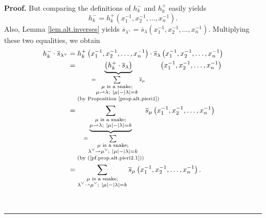 \documentclass[numbers=enddot,12pt,final,onecolumn,notitlepage]{scrartcl}%
\theoremstyle{definition}
\newenvironment{proof}[1][Proof]{\noindent\textbf{#1.} }{\ \rule{0.5em}{0.5em}}
\let\sumnonlimits\sum
\renewcommand{\sum}{\sumnonlimits\limits}
\newenvironment{vershort}{}{}
\begin{document}
\begin{proof}
\begin{vershort}
But comparing the definitions of $h_{k}^{-}$ and $h_{k}^{+}$ easily yields%
\[
h_{k}^{-}=h_{k}^{+}\left(  x_{1}^{-1},x_{2}^{-1},\ldots,x_{n}^{-1}\right)  .
\]
Also, Lemma \ref{lem.alt.inverses} yields $\overline{s}_{\lambda^{\vee}%
}=\overline{s}_{\lambda}\left(  x_{1}^{-1},x_{2}^{-1},\ldots,x_{n}%
^{-1}\right)  $. Multiplying these two equalities, we obtain%
\begin{align*}
h_{k}^{-}\cdot\overline{s}_{\lambda^{\vee}}  &  =h_{k}^{+}\left(  x_{1}%
^{-1},x_{2}^{-1},\ldots,x_{n}^{-1}\right)  \cdot\overline{s}_{\lambda}\left(
x_{1}^{-1},x_{2}^{-1},\ldots,x_{n}^{-1}\right) \\
&  =\underbrace{\left(  h_{k}^{+}\cdot\overline{s}_{\lambda}\right)
}_{\substack{=\sum_{\substack{\mu\text{ is a snake;}\\\mu\rightharpoonup
\lambda;\ \left\vert \mu\right\vert -\left\vert \lambda\right\vert
=k}}\overline{s}_{\mu}\\\text{(by Proposition \ref{prop.alt.pieri1})}}}\left(
x_{1}^{-1},x_{2}^{-1},\ldots,x_{n}^{-1}\right) \\
&  =\underbrace{\sum_{\substack{\mu\text{ is a snake;}\\\mu\rightharpoonup
\lambda;\ \left\vert \mu\right\vert -\left\vert \lambda\right\vert =k}%
}}_{\substack{=\sum_{\substack{\mu\text{ is a snake;}\\\lambda^{\vee
}\rightharpoonup\mu^{\vee};\ \left\vert \mu\right\vert -\left\vert
\lambda\right\vert =k}}\\\text{(by (\ref{pf.prop.alt.pieri2.1}))}}%
}\overline{s}_{\mu}\left(  x_{1}^{-1},x_{2}^{-1},\ldots,x_{n}^{-1}\right) \\
&  =\sum_{\substack{\mu\text{ is a snake;}\\\lambda^{\vee}\rightharpoonup
\mu^{\vee};\ \left\vert \mu\right\vert -\left\vert \lambda\right\vert
=k}}\overline{s}_{\mu}\left(  x_{1}^{-1},x_{2}^{-1},\ldots,x_{n}^{-1}\right)
.
\end{align*}

\end{vershort}


\end{proof}
\end{document}
